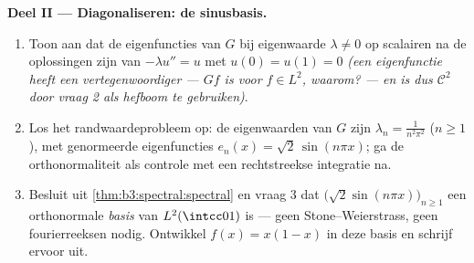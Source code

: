 \begin{problem}
\medskip
\noindent\textbf{Deel II --- Diagonaliseren: de sinusbasis.}
\begin{enumerate}[resume]
  \item Toon aan dat de eigenfuncties van $G$ bij eigenwaarde
        $\lambda \ne 0$ op scalairen na de oplossingen zijn van
        $-\lambda u'' = u$ met $u(0) = u(1) = 0$ \emph{(een
        eigenfunctie heeft een  vertegenwoordiger ---
        $Gf$ is  voor $f \in L^2$, waarom? --- en is dus
        $\mathcal C^2$ door vraag 2 als hefboom te gebruiken)}.
  \item Los het randwaardeprobleem op: de eigenwaarden van $G$
        zijn $\lambda_n = \frac1{n^2\pi^2}$ ($n \geq 1$), met
        genormeerde eigenfuncties $e_n(x) = \sqrt2\,\sin(n\pi
        x)$; ga de orthonormaliteit als controle met een
        rechtstreekse integratie na.
  \item Besluit uit \cref{thm:b3:spectral:spectral} en vraag 3
        dat $\bigl(\sqrt2\sin(n\pi x)\bigr)_{n\geq1}$ een
        orthonormale \emph{basis} van $L^2(\intcc01)$ is --- geen
        Stone--Weierstrass, geen fourierreeksen nodig. Ontwikkel
        $f(x) = x(1-x)$ in deze basis en schrijf  ervoor
        uit.
\end{enumerate}


\end{problem}
